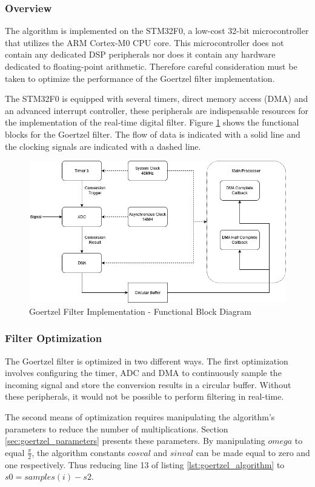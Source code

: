 \subsubsection{Overview}
The algorithm is implemented on the STM32F0, a low-cost 32-bit microcontroller that utilizes the ARM Cortex-M0 CPU core. This microcontroller does not contain any dedicated DSP peripherals nor does it contain any hardware dedicated to floating-point arithmetic. Therefore careful consideration must be taken to optimize the performance of the Goertzel filter implementation.

The STM32F0 is equipped with several timers, direct memory access (DMA) and an advanced interrupt controller, these peripherals are indispensable resources for the implementation of the real-time digital filter. Figure \ref{fig:goertzel_functional_diagram} shows the functional blocks for the Goertzel filter. The flow of data is indicated with a solid line and the clocking signals are indicated with a dashed line.

\begin{figure}[H]
	\centering
	\includegraphics[width=.8\textwidth]{figures/design/goertzel_filter_functional.png}
	\caption{Goertzel Filter Implementation - Functional Block Diagram}
	\label{fig:goertzel_functional_diagram}
\end{figure}


\subsubsection{Filter Optimization}
\label{sec:filter_optimization_design}
The Goertzel filter is optimized in two different ways. The first optimization involves configuring the timer, ADC and DMA to continuously sample the incoming signal and store the conversion results in a circular buffer. Without these peripherals, it would not be possible to perform filtering in real-time.

The second means of optimization requires manipulating the algorithm's parameters to reduce the number of multiplications. Section \ref{sec:goertzel_parameters} presents these parameters. By manipulating $omega$ to equal $\frac{\pi}{2}$, the algorithm constants $cosval$ and $sinval$ can be made equal to zero and one respectively. Thus reducing line 13 of listing \ref{lst:goertzel_algorithm} to $s0 = samples(i) - s2$. 

